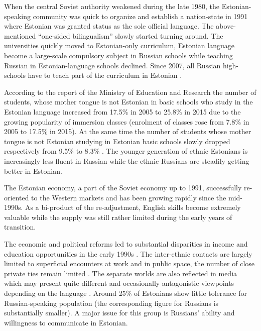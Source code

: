 \documentclass[12pt, a4paper]{article}
\begin{document}
When the central Soviet authority weakened during the late 1980, the
Estonian-speaking community was quick to organize and establish a
nation-state in 1991 where
Estonian was granted status as the sole official language.  The
above-mentioned ``one-sided bilingualism'' slowly started turning
around.  The universities quickly moved to Estonian-only curriculum,
Estonian language become a large-scale compulsory subject in Russian
schools while teaching Russian in Estonian-language schools declined.
Since 2007, all Russian high-schools have to teach part of the
curriculum in Estonian \citep{lindemann+saar2011Russian2ndGeneration}.

According to the report of the Ministry of Education and Research the number
of students, whose mother tongue is not Estonian in basic schools who study in the Estonian language increased from 17.5\% in 2005 to 25.8\% in 2015 due to the growing popularity of immersion
classes (enrolment of classes rose from 7.8\% in 2005 to 17.5\% in 2015).
At the same time the number of students whose mother tongue is not
Estonian studying in Estonian basic schools slowly dropped
respectively from 9.5\% to  8.3\% \citep{HTM2015}.  The younger generation of ethnic Estonians is
increasingly less fluent in Russian while the ethnic Russians are
steadily getting better in Estonian.

The Estonian economy, a part of the Soviet economy up to 1991, successfully
re-oriented to the Western markets and has been growing rapidly since
the mid-1990s.  
  As
a bi-product of the re-adjustment, English skills become extremely
valuable while the supply was still rather limited during the early
years of transition.

The economic and political reforms led to substantial
disparities in income and education opportunities
in the early 1990s \citep{Leping2008,
	lindemann+saar2011Russian2ndGeneration}.  The inter-ethnic contacts
are largely limited to superficial encounters at work and in public
space, the number of close private ties remain limited
\citep{korts2009JofBaltStud}.  The
separate worlds are also reflected in media which may present quite
different and occasionally antagonistic viewpoints depending on the
language \citep{Korts2002}.  Around 25\% of Estonians show little
tolerance for Russian-speaking population (the corresponding figure
for Russians is substantially smaller).  A major issue for this group
is Russians' ability and willingness to communicate in Estonian.
\end{document}
